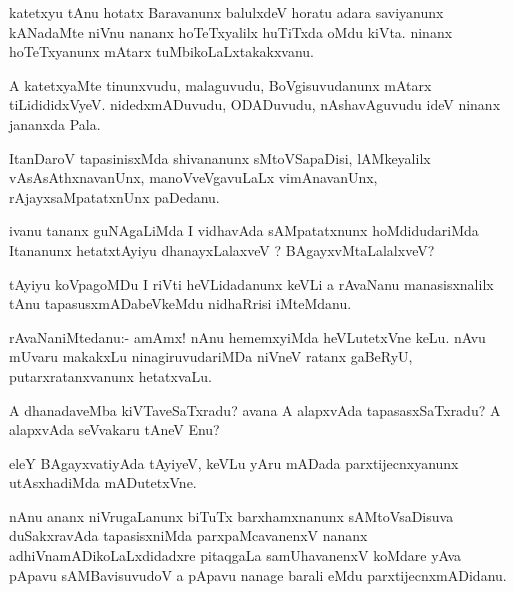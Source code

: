 \documentclass{article}
\begin{document}
\begin{mn}%
katetxyu tAnu hotatx Baravanunx balulxdeV horatu adara saviyanunx kANadaMte niVnu nananx 
hoTeTxyalilx huTiTxda oMdu kiVta. ninanx hoTeTxyanunx mAtarx tuMbikoLaLxtakakxvanu.
\end{mn}

\begin{mn}%
A katetxyaMte tinunxvudu, malaguvudu, BoVgisuvudanunx mAtarx tiLidididxVyeV. 
nidedxmADuvudu, ODADuvudu, nAshavAguvudu ideV ninanx jananxda Pala.
\end{mn}

\begin{mn}%
ItanDaroV tapasinisxMda shivananunx sMtoVSapaDisi, lAMkeyalilx vAsAsAthxnavanUnx, 
manoVveVgavuLaLx vimAnavanUnx, rAjayxsaMpatatxnUnx paDedanu.
\end{mn}

\begin{mn}%
ivanu tananx guNAgaLiMda I vidhavAda sAMpatatxnunx hoMdidudariMda Itananunx hetatxtAyiyu 
dhanayxLalaxveV ? BAgayxvMtaLalalxveV?
\end{mn}

\begin{mn}%
tAyiyu koVpagoMDu I riVti heVLidadanunx keVLi a rAvaNanu manasisxnalilx tAnu 
tapasusxmADabeVkeMdu nidhaRrisi iMteMdanu.
\end{mn}

\begin{mn}%
rAvaNaniMtedanu:- amAmx! nAnu hememxyiMda heVLutetxVne keLu. nAvu mUvaru makakxLu 
ninagiruvudariMDa niVneV ratanx gaBeRyU, putarxratanxvanunx hetatxvaLu.
\end{mn}

\begin{mn}%
A dhanadaveMba kiVTaveSaTxradu? avana A alapxvAda tapasasxSaTxradu? A alapxvAda seVvakaru 
tAneV Enu?
\end{mn}

\begin{mn}%
eleY BAgayxvatiyAda tAyiyeV, keVLu yAru mADada parxtijecnxyanunx utAsxhadiMda mADutetxVne.
\end{mn}

\begin{mn}%
nAnu ananx niVrugaLanunx biTuTx barxhamxnanunx sAMtoVsaDisuva duSakxravAda tapasisxniMda 
parxpaMcavanenxV nananx adhiVnamADikoLaLxdidadxre pitaqgaLa samUhavanenxV koMdare yAva 
pApavu sAMBavisuvudoV a pApavu nanage barali eMdu parxtijecnxmADidanu.
\end{mn}
\end{document}
